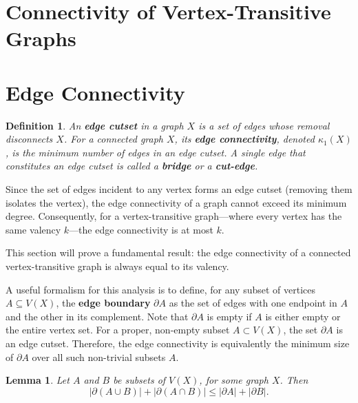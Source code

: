 \documentclass[12pt,a4paper,openany]{book}
\newtheorem{definition}{Definition}[section]
\newtheorem{lemma}{Lemma}[section]
\begin{document}
\section{Connectivity of Vertex-Transitive Graphs}



\section{Edge Connectivity}

\begin{definition}
An \textbf{edge cutset} in a graph $X$ is a set of edges whose removal disconnects $X$. For a connected graph $X$, its \textbf{edge connectivity}, denoted $\kappa_1(X)$, is the minimum number of edges in an edge cutset. A single edge that constitutes an edge cutset is called a \textbf{bridge} or a \textbf{cut-edge}.
\end{definition}

Since the set of edges incident to any vertex forms an edge cutset (removing them isolates the vertex), the edge connectivity of a graph cannot exceed its minimum degree. Consequently, for a vertex-transitive graph---where every vertex has the same valency $k$---the edge connectivity is at most $k$.

This section will prove a fundamental result: the edge connectivity of a connected vertex-transitive graph is always equal to its valency.

A useful formalism for this analysis is to define, for any subset of vertices $A \subseteq V(X)$, the \textbf{edge boundary} $\partial A$ as the set of edges with one endpoint in $A$ and the other in its complement. Note that $\partial A$ is empty if $A$ is either empty or the entire vertex set. For a proper, non-empty subset $A \subset V(X)$, the set $\partial A$ is an edge cutset. Therefore, the edge connectivity is equivalently the minimum size of $\partial A$ over all such non-trivial subsets $A$.
\begin{lemma}\label{lem:edge-cut-inequality}
Let $A$ and $B$ be subsets of $V(X)$, for some graph $X$. Then
\[
|\partial(A \cup B)| + |\partial(A \cap B)| \leq |\partial A| + |\partial B|.
\]
\end{lemma}
\end{document}
